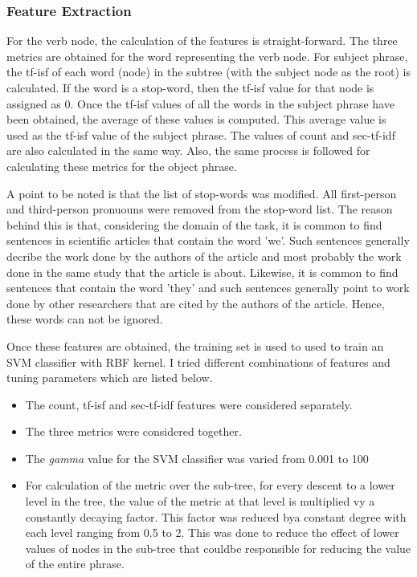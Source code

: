 \subsubsection*{Feature Extraction}
For the verb node, the calculation of the features is straight-forward.
The three metrics are obtained for the word representing the verb node.
For subject phrase, the tf-isf of each word (node) in the subtree (with the subject node as the root) is calculated.
If the word is a stop-word, then the tf-isf value for that node is assigned as 0.
Once the tf-isf values of all the words in the subject phrase have been obtained, the average of these values is computed.
This average value is used as the tf-isf value of the subject phrase.
The values of count and sec-tf-idf are also calculated in the same way.
Also, the same process is followed for calculating these metrics for the object phrase.


A point to be noted is that the list of stop-words was modified.
All first-person and third-person pronuouns were removed from the stop-word list.
The reason behind this is that, considering the domain of the task, it is common to find sentences in scientific articles that contain the word 'we'.
Such sentences generally decribe the work done by the authors of the article and most probably the work done in the same study that the article is about.
Likewise, it is common to find sentences that contain the word 'they' and such sentences generally point to work done by other researchers that are cited by the authors of the article.
Hence, these words can not be ignored.

Once these features are obtained, the training set is used to used to train an SVM classifier with RBF kernel.
I tried different combinations of features and tuning parameters which are listed below.
\begin{itemize}
\item The count, tf-isf and sec-tf-idf features were considered separately.
\item The three metrics were considered together.
\item The \textit{gamma} value for the SVM classifier was varied from 0.001 to 100
\item For calculation of the metric over the sub-tree, for every descent to a lower level in the tree, the value of the metric at that level is multiplied vy a constantly decaying factor.
This factor was reduced bya constant degree with each level ranging from 0.5 to 2.
This was done to reduce the effect of lower values of nodes in the sub-tree that couldbe responsible for reducing the value of the entire phrase.
\end{itemize}

